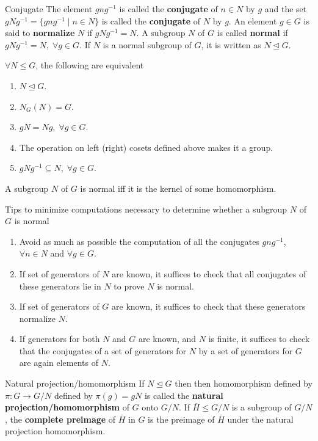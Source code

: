 \documentclass[titlepage, 12pt]{article}
\begin{document}
\begin{definition}{Conjugate}{}
    The element $gng^{-1}$ is called the \textbf{conjugate} of $n\in N$ by $g$
    and the set $gNg^{-1} = \{gng^{-1}\;|\;n\in N\}$ is called the
    \textbf{conjugate} of $N$ by $g$. An element $g\in G$ is said to
    \textbf{normalize} $N$ if $gNg^{-1} = N$. A subgroup $N$ of $G$ is called
    \textbf{normal} if $gNg^{-1} = N,\;\forall g\in G$. If $N$ is a normal
    subgroup of $G$, it is written as $N\trianglelefteq G$.
\end{definition}
\begin{theorem}{}{}
    $\forall N\le G$, the following are equivalent
    \begin{enumerate}
        \item $N\trianglelefteq G$.
        \item $N_G(N) = G$.
        \item $gN = Ng,\;\forall g\in G$.
        \item The operation on left (right) cosets defined above makes it a
            group.
        \item $gNg^{-1}\subseteq N,\;\forall g\in G$.
    \end{enumerate}
\end{theorem}
\begin{proposition}{}{}
    A subgroup $N$ of $G$ is normal iff it is the kernel of some homomorphism.
\end{proposition}
Tips to minimize computations necessary to determine whether a subgroup $N$ of
$G$ is normal
\begin{enumerate}
    \item Avoid as much as possible the computation of all the conjugates
        $gng^{-1}$, $\forall n\in N$ and $\forall g\in G$.
    \item If set of generators of $N$ are known, it suffices to check that all
        conjugates of these generators lie in $N$ to prove $N$ is normal.
    \item If set of generators of $G$ are known, it suffices to check that these
        generators normalize $N$.
    \item If generators for both $N$ and $G$ are known, and $N$ is finite, it
        suffices to check that the conjugates of a set of generators for $N$ by
        a set of generators for $G$ are again elements of $N$.
\end{enumerate}
\begin{definition}{Natural projection/homomorphism}{}
    If $N\trianglelefteq G$ then then homomorphism defined by $\pi:G\rightarrow
    G/N$ defined by $\pi(g) = gN$ is called the \textbf{natural
    projection/homomorphism} of $G$ onto $G/N$. If $\overline H\le G/N$ is a
    subgroup of $G/N$, the \textbf{complete preimage} of $\overline H$ in $G$ is
    the preimage of $\overline H$ under the natural projection homomorphism.
\end{definition}
\end{document}
